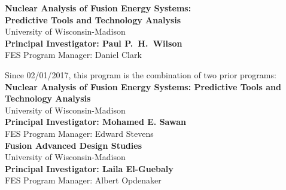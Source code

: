 
\begin{titlepage}
  \begin{center}

    {\Large\bfseries Nuclear Analysis of Fusion Energy Systems:\\ Predictive Tools and Technology Analysis}\\[12pt]
    University of Wisconsin-Madison\\[8pt]
    {\bfseries Principal Investigator: Paul P.\ H.\ Wilson}\\[8pt]
    FES Program Manager: Daniel Clark

    \vspace{2cm}
    Since 02/01/2017, this program is the combination of two prior programs:\\[1cm]
    {\large\bfseries Nuclear Analysis of Fusion Energy Systems: Predictive Tools and Technology Analysis}\\[6pt]
    University of Wisconsin-Madison\\[6pt]
    {\bfseries Principal Investigator: Mohamed E. Sawan}\\[6pt]
    FES Program Manager: Edward Stevens\\[2cm]

    {\large\bfseries Fusion Advanced Design Studies}\\[6pt]
    University of Wisconsin-Madison\\[6pt]
    {\bfseries Principal Investigator: Laila El-Guebaly}\\[6pt]
    FES Program Manager: Albert Opdenaker


    
  \end{center}
\end{titlepage}

